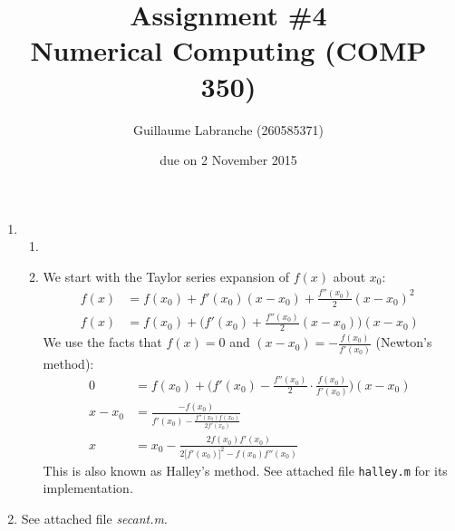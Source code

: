 \documentclass{article}
\author{Guillaume Labranche (260585371)}
\title{Assignment \#4\\Numerical Computing (COMP 350)}
\date{due on 2 November 2015}
\begin{document}
\maketitle
 
\begin{enumerate}
\item \begin{enumerate}
\item
\item We start with the Taylor series expansion of $f(x)$ about $x_0$:
\begin{align*}
f(x) &= f(x_0) + f'(x_0)(x-x_0) + \frac{f''(x_0)}{2}(x-x_0)^2 \\
f(x) &= f(x_0) + \Big(f'(x_0) + \frac{f''(x_0)}{2}(x-x_0)\Big) (x-x_0)
\end{align*}
We use the facts that $f(x)=0$ and $(x-x_0)=-\frac{f(x_0)}{f'(x_0)}$ (Newton's method):
\begin{align*}
0 &= f(x_0) + \Big(f'(x_0) - \frac{f''(x_0)}{2} \cdot \frac{f(x_0)}{f'(x_0)} \Big) (x-x_0) \\
x-x_0 &= \frac{-f(x_0)}{f'(x_0) - \frac{f''(x_0) f(x_0)}{2 f'(x_0)}} \\
x &= x_0 - \frac{2f(x_0)f'(x_0)}{2\big[f'(x_0)\big]^2 - f(x_0) f''(x_0)} 
\end{align*}
This is also known as Halley's method. See attached file \texttt{halley.m} for its implementation.
\end{enumerate}
\item See attached file \emph{secant.m}.
\end{enumerate}
\end{document}

